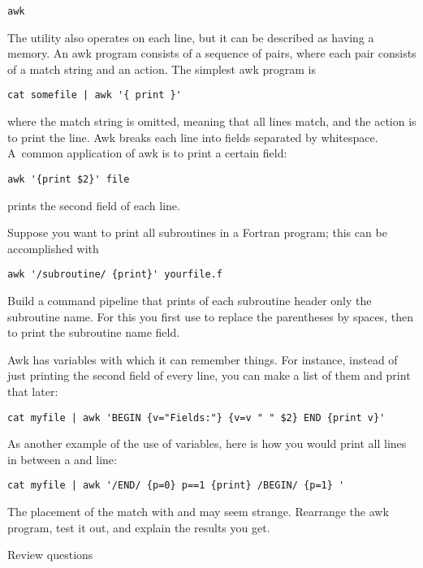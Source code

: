  {\tt awk}

The  utility also operates on each line, but it can be
described as having a memory. An awk program consists of a sequence of
pairs, where each pair consists of a match string and an action. The
simplest awk program is
\begin{lstlisting}
cat somefile | awk '{ print }'
\end{lstlisting}
where the match string is omitted, meaning that all lines match, and
the action is to print the line. Awk breaks each line into fields
separated by whitespace. A~common application of awk is to print a
certain field:
\begin{lstlisting}
awk '{print $2}' file
\end{lstlisting}
prints the second field of each line.

Suppose you want to print all subroutines in a Fortran program; this
can be accomplished with
\begin{lstlisting}
awk '/subroutine/ {print}' yourfile.f
\end{lstlisting}

\begin{exercise}
  Build a command pipeline that prints of each subroutine header only
  the subroutine name. For this you first use  to replace the
  parentheses by spaces, then  to print the subroutine name
  field.
\end{exercise}

Awk has variables with which it can remember things. For instance,
instead of just printing the second field of every line, you can make
a list of them and print that later:
\begin{lstlisting}
cat myfile | awk 'BEGIN {v="Fields:"} {v=v " " $2} END {print v}'
\end{lstlisting}

As another example of the use of variables, here is how you would
print all lines in between a  and  line:
\begin{lstlisting}
cat myfile | awk '/END/ {p=0} p==1 {print} /BEGIN/ {p=1} '
\end{lstlisting}

\begin{exercise}
  The placement of the match with  and  may seem
  strange. Rearrange the awk program, test it out, and explain the
  results you get.
\end{exercise}

 {Review questions}

